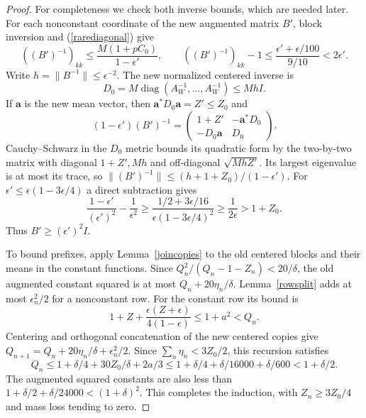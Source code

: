 \documentclass[reqno,a4paper,12pt]{amsart}
\newcommand{\diag}{\operatorname{diag}}
\begin{document}
\begin{proof}
For completeness we check both inverse bounds, which are needed later.
For each nonconstant coordinate of the new augmented matrix $B'$, block
inversion and (\ref{rarediagonal}) give
\[
 ((B')^{-1})_{kk}\le\frac{M(1+pC_0)}{1-\epsilon'},\qquad
 ((B')^{-1})_{kk}-1
 \le\frac{\epsilon'+\epsilon/100}{9/10}<2\epsilon'.
\]
Write $h=\|B^{-1}\|\le\epsilon^{-2}$.
The new normalized centered inverse is
\[
 D_0=M\diag(A_W^{-1},\ldots,A_W^{-1})\le MhI.
\]
If $\mathbf a$ is the new mean vector, then
$\mathbf a^*D_0\mathbf a=Z'\le Z_0$ and
\[
 (1-\epsilon')(B')^{-1}
 =\begin{pmatrix}1+Z'&-\mathbf a^*D_0\\-D_0\mathbf a&D_0\end{pmatrix}.
\]
Cauchy--Schwarz in the $D_0$ metric bounds its quadratic form by the
two-by-two matrix with diagonal $1+Z',Mh$ and off-diagonal
$\sqrt{MhZ'}$. Its largest eigenvalue is at most its trace, so
$\|(B')^{-1}\|\le(h+1+Z_0)/(1-\epsilon')$.
For $\epsilon'\le\epsilon(1-3\epsilon/4)$ a direct subtraction gives
\[
 \frac{1-\epsilon'}{(\epsilon')^2}-\frac1{\epsilon^2}
 \ge\frac{1/2+3\epsilon/16}{\epsilon(1-3\epsilon/4)^2}
 \ge\frac1{2\epsilon}>1+Z_0.
\]
Thus $B'\ge(\epsilon')^2I$.

To bound prefixes, apply Lemma~\ref{joincopies} to the old centered
blocks and their means in the constant functions. Since
$Q_n^2/(Q_n-1-Z_n)<20/\delta$, the old augmented constant squared is
at most $Q_n+20\eta_n/\delta$.
Lemma~\ref{rowsplit} adds at most $\epsilon_n^2/2$ for a nonconstant row.
For the constant row its bound is
\[
 1+Z+\frac{\epsilon(Z+\epsilon)}{4(1-\epsilon)}
 \le1+a^2<Q_n.
\]
Centering and orthogonal concatenation of the new centered copies give
$Q_{n+1}=Q_n+20\eta_n/\delta+\epsilon_n^2/2$.
Since $\sum_n\eta_n<3Z_0/2$, this recursion satisfies
\[
 Q_n\le1+\delta/4+30Z_0/\delta+2a/3
 \le1+\delta/4+\delta/16000+\delta/600<1+\delta/2.
\]
The augmented squared constants are also less than
$1+\delta/2+\delta/24000<(1+\delta)^2$.
This completes the induction, with $Z_n\ge3Z_0/4$ and mass loss tending to zero.


\end{proof}
\end{document}
